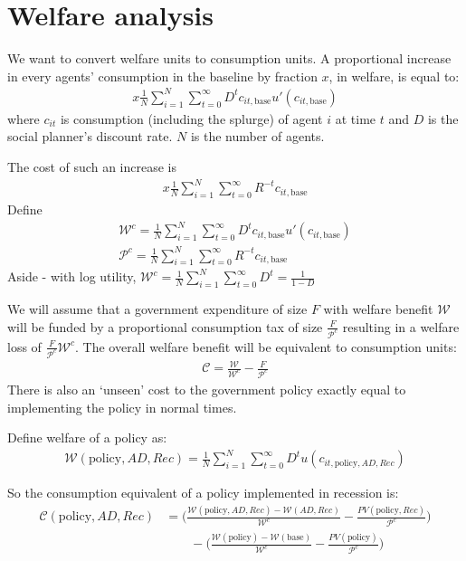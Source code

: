 \section{Welfare analysis}

We want to convert welfare units to consumption units. A proportional increase in every agents' consumption in the baseline by fraction $x$, in welfare, is equal to:
\begin{align}
x\frac{1}{N}\sum_{i=1}^{N} \sum_{t=0}^{\infty} D^t c_{it,\text{base}} u'(c_{it,\text{base}})
\end{align}
where $c_{it}$ is consumption (including the splurge) of agent $i$ at time $t$ and $D$ is the social planner's discount rate. $N$ is the number of agents.


The cost of such an increase is
\begin{align}
x\frac{1}{N}\sum_{i=1}^{N} \sum_{t=0}^{\infty} R^{-t} c_{it,\text{base}}
\end{align}
Define
\begin{align}
\mathcal{W}^c =\frac{1}{N}\sum_{i=1}^{N} \sum_{t=0}^{\infty} D^t c_{it,\text{base}} u'(c_{it,\text{base}}) \\
\mathcal{P}^c = \frac{1}{N}\sum_{i=1}^{N} \sum_{t=0}^{\infty} R^{-t} c_{it,\text{base}}
\end{align}
Aside - with log utility, $\mathcal{W}^c =\frac{1}{N}\sum_{i=1}^{N} \sum_{t=0}^{\infty} D^t = \frac{1}{1-D}$

We will assume that a government expenditure of size $F$ with welfare benefit $\mathcal{W}$ will be funded by a proportional consumption tax of size $\frac{F}{\mathcal{P}^c}$ resulting in a welfare loss of $\frac{F}{\mathcal{P}^c}\mathcal{W}^c$. The overall welfare benefit will be equivalent to consumption units:
\begin{align}
\mathcal{C} = \frac{\mathcal{W}}{\mathcal{W}^c} - \frac{F}{\mathcal{P}^c}
\end{align}
There is also an `unseen' cost to the government policy exactly equal to implementing the policy in normal times.

Define welfare of a policy as:
\begin{align}
\mathcal{W}(\text{policy},AD,Rec) = \frac{1}{N}\sum_{i=1}^{N} \sum_{t=0}^{\infty} D^t u(c_{it,\text{policy},AD,Rec})
\end{align}

So the consumption equivalent of a policy implemented in recession is:
\begin{align}
\mathcal{C}(\text{policy},AD,Rec) &= \bigg(\frac{\mathcal{W}(\text{policy},AD,Rec)-\mathcal{W}(AD,Rec)}{\mathcal{W}^c} - \frac{PV(\text{policy},Rec)}{\mathcal{P}^c} \bigg)\\ \nonumber
& \qquad -
\bigg(\frac{\mathcal{W}(\text{policy}) - \mathcal{W}(\text{base})}{\mathcal{W}^c} - \frac{PV(\text{policy})}{\mathcal{P}^c} \bigg)
\end{align}

